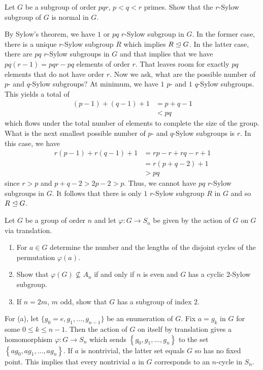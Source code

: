 \begin{problem}
  Let \(G\) be a subgroup of order \(pqr\), \(p<q<r\) primes. Show that the
  \(r\)-Sylow subgroup of \(G\) is normal in \(G\).
\end{problem}
\begin{solution}
  By Sylow's theorem, we have \(1\) or \(pq\) \(r\)-Sylow subgroup in
  \(G\). In the former case, there is a unique \(r\)-Sylow subgroup \(R\)
  which implies \(R\trianglelefteq G\). In the latter case, there are \(pq\)
  \(r\)-Sylow subgroups in \(G\) and that implies that we have
  \(pq(r-1)=pqr-pq\) elements of order \(r\). That leaves room for exactly
  \(pq\) elements that do not have order \(r\). Now we ask, what are the
  possible number of \(p\)- and \(q\)-Sylow subgroups? At minimum, we have
  \(1\) \(p\)- and \(1\) \(q\)-Sylow subgroups. This yields a total of
  \begin{align*}
    (p-1)+(q-1)+1&=p+q-1\\
                 &<pq
  \end{align*}
  which flows under the total number of elements to complete the size of
  the group. What is the next smallest possible number of \(p\)- and
  \(q\)-Sylow subgroups is \(r\). In this case, we have
  \begin{align*}
    r(p-1)+r(q-1)+1&=rp-r+rq-r+1\\
                   &=r(p+q-2)+1\\
                   &>pq
  \end{align*}
  since \(r>p\) and \(p+q-2>2p-2>p\). Thus, we cannot have \(pq\)
  \(r\)-Sylow subgroups in \(G\). It follows that there is only \(1\)
  \(r\)-Sylow subgroup \(R\) in \(G\) and so \(R\trianglelefteq G\).
\end{solution}

\begin{problem}
  Let \(G\) be a group of order \(n\) and let \(\varphi\colon G\to S_n\) be
  given by the action of \(G\) on \(G\) via translation.
  \begin{enumerate}[label=(\alph*),noitemsep]
  \item For \(a\in G\) determine the number and the lengths of the disjoint
    cycles of the permutation \(\varphi(a)\).
  \item Show that \(\varphi(G)\nsubseteq A_n\) if and only if \(n\) is even
    and \(G\) has a cyclic \(2\)-Sylow subgroup.
  \item If \(n=2m\), \(m\) odd, show that \(G\) has a subgroup of index
    \(2\).
  \end{enumerate}
\end{problem}
\begin{solution}
  For (a), let \(\{g_0=e,g_1,\dotsc,g_{n-1}\}\) be an enumeration of
  \(G\). Fix \(a=g_k\) in \(G\) for some \(0\leq k\leq n-1\). Then the
  action of \(G\) on itself by translation gives a homomorphism
  \(\varphi\colon G\to S_n\) which sends
  \(\left\{g_0,g_1,\dotsc,g_n\right\}\) to the set
  \(\left\{ag_0,ag_1,\dotsc,ag_n\right\}\). If \(a\) is nontrivial, the
  latter set equals \(G\) so has no fixed point. This implies that every
  nontrivial \(a\) in \(G\) corresponds to an \(n\)-cycle in \(S_n\).
\end{solution}

